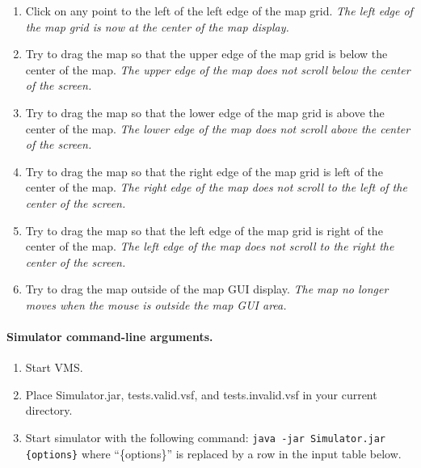 \documentclass{article}
\begin{document}
\begin{enumerate}
\item Click on any point to the left of the left edge of the map grid. \emph{The left edge of the map grid is now at the center of the map display.}
\item Try to drag the map so that the upper edge of the map grid is below the center of the map. \emph{The upper edge of the map does not scroll below the center of the screen.}
\item Try to drag the map so that the lower edge of the map grid is above the center of the map. \emph{The lower edge of the map does not scroll above the center of the screen.}
\item Try to drag the map so that the right edge of the map grid is left of the center of the map. \emph{The right edge of the map does not scroll to the left of the center of the screen.}
\item Try to drag the map so that the left edge of the map grid is right of the center of the map. \emph{The left edge of the map does not scroll to the right the center of the screen.}
\item Try to drag the map outside of the map GUI display. \emph{The map no longer moves when the mouse is outside the map GUI area.}
\end{enumerate}

\paragraph{Simulator command-line arguments.}
\begin{enumerate}
\item Start VMS.
\item Place Simulator.jar, tests.valid.vsf, and tests.invalid.vsf in your current directory.
\item Start simulator with the following command: \verb|java -jar Simulator.jar {options}| where ``\{options\}'' is replaced by a row in the input table below.
\end{enumerate}
\end{document}

